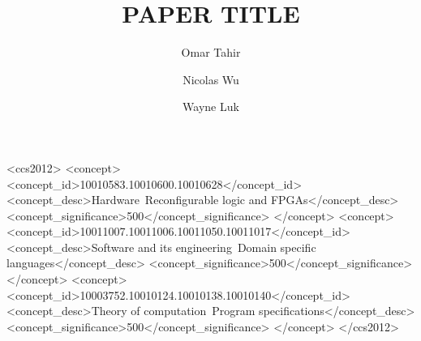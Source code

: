 \documentclass[acmsmall,review,fleqn]{acmart}
\begin{document}
\title{PAPER TITLE}
\author{Omar Tahir}

\author{Nicolas Wu}

\author{Wayne Luk}


\begin{CCSXML}
<ccs2012>
  <concept>
      <concept_id>10010583.10010600.10010628</concept_id>
      <concept_desc>Hardware~Reconfigurable logic and FPGAs</concept_desc>
      <concept_significance>500</concept_significance>
  </concept>
  <concept>
      <concept_id>10011007.10011006.10011050.10011017</concept_id>
      <concept_desc>Software and its engineering~Domain specific languages</concept_desc>
      <concept_significance>500</concept_significance>
  </concept>
  <concept>
      <concept_id>10003752.10010124.10010138.10010140</concept_id>
      <concept_desc>Theory of computation~Program specifications</concept_desc>
      <concept_significance>500</concept_significance>
  </concept>
</ccs2012>
\end{CCSXML}





\maketitle


\clearpage
\end{document}
